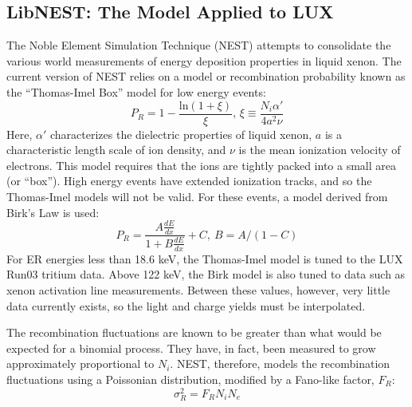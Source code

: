 \subsection{LibNEST: The Model Applied to LUX}\label{sec:libnest}
The Noble Element Simulation Technique (NEST) attempts to consolidate the various world measurements of energy deposition properties in liquid xenon\cite{nest1,nest2,lenardo}. The current version of NEST relies on a model or recombination probability known as the ``Thomas-Imel Box'' model for low energy events\cite{nest1}:
\begin{equation}
P_R=1-\frac{\text{ln}(1+\xi)}{\xi} \text{, } \xi \equiv \frac{N_i \alpha'}{4a^2\nu}
\end{equation}
Here, $\alpha'$ characterizes the dielectric properties of liquid xenon, $a$ is a characteristic length scale of ion density, and $\nu$ is the mean ionization velocity of electrons. This model requires that the ions are tightly packed into a small area (or ``box''). High energy events have extended ionization tracks, and so the Thomas-Imel models will not be valid. For these events, a model derived from Birk's Law is used\cite{nest1}:
\begin{equation}
P_R=\frac{A\frac{dE}{dx}}{1+B\frac{dE}{dx}}+C , \ B=A/(1-C)
\end{equation}
For ER energies less than 18.6 keV, the Thomas-Imel model is tuned to the LUX Run03 tritium data\cite{lux_tritium}. Above 122 keV, the Birk model is also tuned to data such as xenon activation line measurements. Between these values, however, very little data currently exists, so the light and charge yields must be interpolated.

The recombination fluctuations are known to be greater than what would be expected for a binomial process. They have, in fact, been measured to grow approximately proportional to $N_i$\cite{attila}. NEST, therefore, models the recombination fluctuations using a Poissonian distribution, modified by a Fano-like factor, $F_R$\cite{Evanyields}:
\begin{equation}
\sigma_R^2=F_RN_iN_e
\end{equation}

